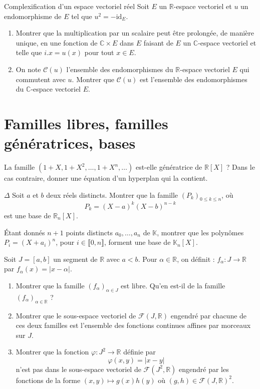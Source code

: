 \documentclass[french,a4paper]{article}
\newcommand{\R}{\mathbb{R}}
\newcommand{\C}{\mathbb{C}}
\newcommand{\K}{\mathbb{K}}
\theoremstyle{plain}
\theoremstyle{definition}
\theoremstyle{remark}
\begin{document}
\begin{ex}[Moulin.EV.07]{Complexification d'un espace vectoriel réel}
	Soit $E$ un $\R$-espace vectoriel et $u$ un endomorphisme de $E$ tel que $u^2=-\text{id}_E$.
	\begin{enumerate}
		\item Montrer que la multiplication par un scalaire peut être prolongée, de manière unique, en une fonction de $\C\times E$ dans $E$ faisant de $E$ un $\C$-espace vectoriel et telle que $i.x=u(x)$ pour tout $x\in E$.
		\item On note $\mathcal{C}(u)$ l'ensemble des endomorphismes du $\R$-espace vectoriel $E$ qui commutent avec $u$. Montrer que $\mathcal{C}(u)$ est l'ensemble des endomorphismes du $\C$-espace vectoriel $E$.
	\end{enumerate}
\end{ex}

\section{Familles libres, familles génératrices, bases}

\begin{ex}[Moulin.EV.08]{}
	La famille $(1+X,1+X^2,\ldots,1+X^n,\ldots)$ est-elle génératrice de $\R[X]$ ? Dans le cas contraire, donner une équation d'un hyperplan qui la contient.
\end{ex}

\begin{ex}[Moulin.EV.09]{$\Delta$}
	Soit $a$ et $b$ deux réels distincts. Montrer que la famille $(P_k)_{0\leqslant k\leqslant n}$, où $$P_k=(X-a)^k(X-b)^{n-k}$$ est une base de $\R_n[X]$.
\end{ex}

\begin{ex}[Moulin.EV.10]{}
	Étant donnés $n+1$ points distincts $a_0,\ldots,a_n$ de $\K$, montrer que les polynômes $P_i=(X+a_i)^n$, pour $i\in\llbracket0,n\rrbracket$, forment une base de $\K_n[X]$.
\end{ex}

\begin{ex}[Moulin.EV.11]{}
	Soit $J=[a,b]$ un segment de $\R$ avec $a<b$. Pour $\alpha\in\R$, on définit : $f_\alpha:J\to\R$ par $f_\alpha(x)=\lvert x-\alpha\rvert$.
	\begin{enumerate}
		\item Montrer que la famille $(f_\alpha)_{\alpha\in J}$ est libre. Qu'en est-il de la famille $(f_\alpha)_{\alpha\in\R}$ ?
		\item Montrer que le sous-espace vectoriel de $\mathcal{F}(J,\R)$ engendré par chacune de ces deux familles est l'ensemble des fonctions continues affines par morceaux sur $J$.
		\item Montrer que la fonction $\varphi:J^2\to\R$ définie par $$\varphi(x,y)=\lvert x-y\rvert$$ n'est pas dans le sous-espace vectoriel de $\mathcal{F}(J^2,\R)$ engendré par les fonctions de la forme $(x,y)\mapsto g(x)h(y)$ où $(g,h)\in\mathcal{F}(J,\R)^2$.
	\end{enumerate}
\end{ex}
\end{document}
